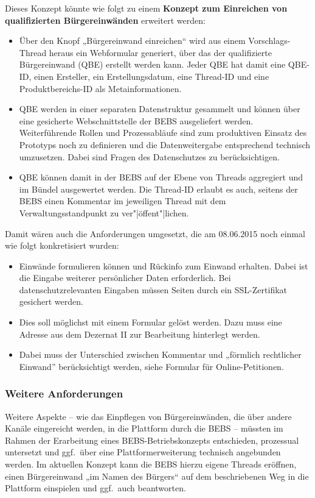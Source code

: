 \documentclass[11pt,a4paper,twoside]{article}
\begin{document}
Dieses Konzept könnte wie folgt zu einem \textbf{Konzept zum Einreichen von
  qualifizierten Bürgereinwänden} erweitert werden:
\begin{itemize}
\item Über den Knopf „Bürgereinwand einreichen“ wird aus einem
  Vorschlags-Thread heraus ein Webformular generiert, über das der
  qualifizierte Bürgereinwand (QBE) erstellt werden kann.  Jeder QBE hat damit
  eine QBE-ID, einen Ersteller, ein Erstellungsdatum, eine Thread-ID und eine
  Produktbereichs-ID als Metainformationen.
\item QBE werden in einer separaten Datenstruktur gesammelt und können über
  eine gesicherte Webschnittstelle der BEBS ausgeliefert werden.
  Weiterführende Rollen und Prozessabläufe sind zum produktiven Einsatz des
  Prototyps noch zu definieren und die Datenweitergabe entsprechend technisch
  umzusetzen.  Dabei sind Fragen des Datenschutzes zu berücksichtigen.
\item QBE können damit in der BEBS auf der Ebene von Threads aggregiert und im
  Bündel ausgewertet werden.  Die Thread-ID erlaubt es auch, seitens der BEBS
  einen Kommentar im jeweiligen Thread mit dem Verwaltungsstandpunkt zu
  ver"|öffent"|lichen. 
\end{itemize}
Damit wären auch die Anforderungen umgesetzt, die am 08.06.2015 noch einmal wie
folgt konkretisiert wurden:
\begin{itemize}
\item Einwände formulieren können und Rückinfo zum Einwand erhalten. Dabei ist
  die Eingabe weiterer persönlicher Daten erforderlich. Bei
  datenschutzrelevanten Eingaben müssen Seiten durch ein SSL-Zertifikat
  gesichert werden. 
\item Dies soll möglichst mit einem Formular gelöst werden. Dazu muss eine
  Adresse aus dem Dezernat II zur Bearbeitung hinterlegt werden.
\item Dabei muss der Unterschied zwischen Kommentar und „förmlich rechtlicher
  Einwand” berücksichtigt werden, siehe Formular für Online-Petitionen.
\end{itemize}

\subsubsection*{Weitere Anforderungen} 

Weitere Aspekte -- wie das Einpflegen von Bürgereinwänden, die über andere
Kanäle eingereicht werden, in die Plattform durch die BEBS -- müssten im
Rahmen der Erarbeitung eines BEBS-Betriebskonzepts entschieden, prozessual
untersetzt und ggf.\ über eine Plattformerweiterung technisch angebunden
werden.  Im aktuellen Konzept kann die BEBS hierzu eigene Threads eröffnen,
einen Bürgereinwand „im Namen des Bürgers“ auf dem beschriebenen Weg in die
Plattform einspielen und ggf.\ auch beantworten. 
\end{document}
